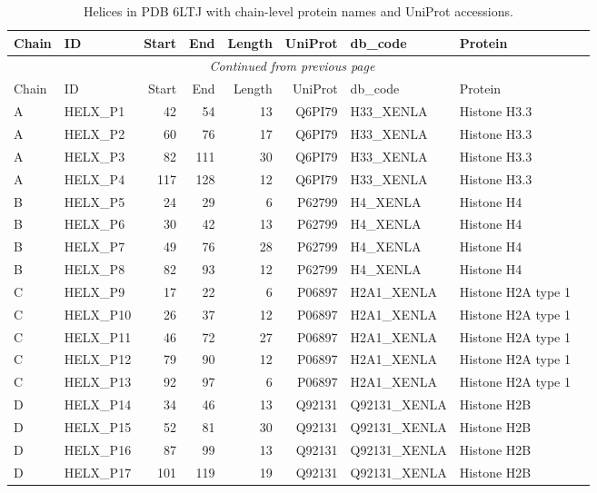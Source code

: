\begin{longtable}{@{}llrrrrllp{5.2cm}@{}}
  \toprule
  Chain & ID & Start & End & Length & UniProt & db\_code & Protein \\
  \midrule
  \endfirsthead
  \multicolumn{8}{c}{\textit{Continued from previous page}} \\
  \toprule
  Chain & ID & Start & End & Length & UniProt & db\_code & Protein \\
  \midrule
  \endhead
  \bottomrule
  \endfoot
  \bottomrule
  \caption{Helices in PDB 6LTJ with chain-level protein names and UniProt accessions.}
  \label{tab:6ltj_helices_uniprot}
  \endlastfoot
  A & HELX_P1 & 42 & 54 & 13 & Q6PI79 & H33_XENLA & Histone H3.3 \\
  A & HELX_P2 & 60 & 76 & 17 & Q6PI79 & H33_XENLA & Histone H3.3 \\
  A & HELX_P3 & 82 & 111 & 30 & Q6PI79 & H33_XENLA & Histone H3.3 \\
  A & HELX_P4 & 117 & 128 & 12 & Q6PI79 & H33_XENLA & Histone H3.3 \\
  B & HELX_P5 & 24 & 29 & 6 & P62799 & H4_XENLA & Histone H4 \\
  B & HELX_P6 & 30 & 42 & 13 & P62799 & H4_XENLA & Histone H4 \\
  B & HELX_P7 & 49 & 76 & 28 & P62799 & H4_XENLA & Histone H4 \\
  B & HELX_P8 & 82 & 93 & 12 & P62799 & H4_XENLA & Histone H4 \\
  C & HELX_P9 & 17 & 22 & 6 & P06897 & H2A1_XENLA & Histone H2A type 1 \\
  C & HELX_P10 & 26 & 37 & 12 & P06897 & H2A1_XENLA & Histone H2A type 1 \\
  C & HELX_P11 & 46 & 72 & 27 & P06897 & H2A1_XENLA & Histone H2A type 1 \\
  C & HELX_P12 & 79 & 90 & 12 & P06897 & H2A1_XENLA & Histone H2A type 1 \\
  C & HELX_P13 & 92 & 97 & 6 & P06897 & H2A1_XENLA & Histone H2A type 1 \\
  D & HELX_P14 & 34 & 46 & 13 & Q92131 & Q92131_XENLA & Histone H2B \\
  D & HELX_P15 & 52 & 81 & 30 & Q92131 & Q92131_XENLA & Histone H2B \\
  D & HELX_P16 & 87 & 99 & 13 & Q92131 & Q92131_XENLA & Histone H2B \\
  D & HELX_P17 & 101 & 119 & 19 & Q92131 & Q92131_XENLA & Histone H2B \\

\end{longtable}
